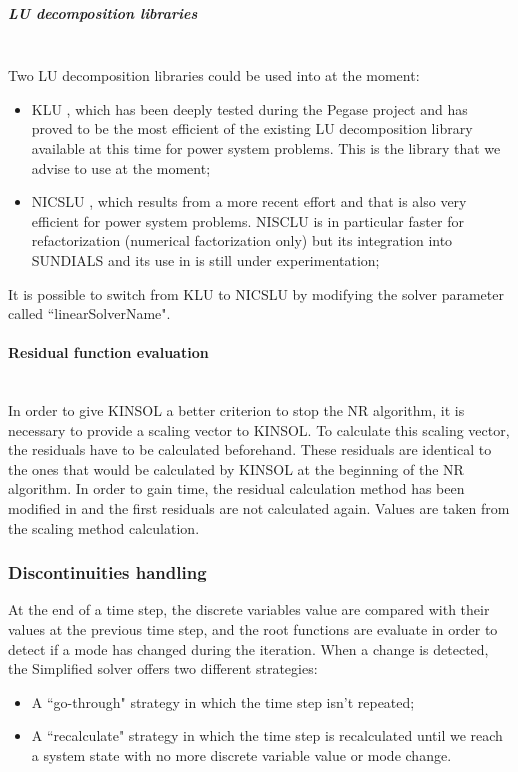 \documentclass[a4paper, 12pt]{report}
\begin{document}
\subparagraph{LU decomposition libraries}
~~\\

Two LU decomposition libraries could be used into \Dynawo   at the moment: 
\begin{itemize}
\item KLU \cite{DavisKLU}, which has been deeply tested during the Pegase project and has proved to be the most efficient of the existing LU decomposition library available at this time for power system problems. This is the library that we advise to use at the moment;
\item NICSLU \cite{chenNicsLu}, which results from a more recent effort and that is also very efficient for power system problems. NISCLU is in particular faster for refactorization (numerical factorization only) but its integration into \ac{SUNDIALS} and its use in \Dynawo is still under experimentation;
\end{itemize} 

It is possible to switch from KLU to NICSLU by modifying the solver parameter called ``linearSolverName".

\paragraph{Residual function evaluation}
~~\\

In order to give \ac{KINSOL} a better criterion to stop the \ac{NR} algorithm, it is necessary to provide a scaling vector to \ac{KINSOL}. To calculate this scaling vector, the residuals have to be calculated beforehand. These residuals are identical to the ones that would be calculated by \ac{KINSOL} at the beginning of the \ac{NR} algorithm. In order to gain time, the residual calculation method has been modified in \Dynawo  and the first residuals are not calculated again. Values are taken from the scaling method calculation.

\subsubsection{Discontinuities handling}

At the end of a time step, the discrete variables value are compared with their values at the previous time step, and the root functions are evaluate in order to detect if a mode has changed during the iteration. When a change is detected, the Simplified solver offers two different strategies: 
\begin{itemize}
\item A ``go-through" strategy in which the time step isn't repeated;
\item A ``recalculate" strategy in which the time step is recalculated until we reach a system state with no more discrete variable value or mode change.
\end{itemize}
\end{document}
